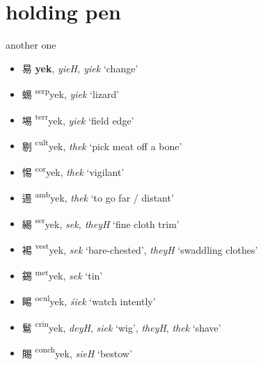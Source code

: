 \section{holding pen}

another one 

\begin{itemize}
    \item {\Large{易}} %
    {\large{\textbf{yek}}},
    \textit{yieH, yiek} `change' %

    \item {\Large{蜴}} %
    {\large{{\textsuperscript{serp}}yek}},
    \textit{yiek} `lizard' %

    \item {\Large{埸}} %
    {\large{{\textsuperscript{terr}}yek}},
    \textit{yiek} `field edge' %

    \item {\Large{剔}} %
    {\large{{\textsuperscript{cult}}yek}},
    \textit{thek} `pick meat off a bone' %

    \item {\Large{惕}} %
    {\large{{\textsuperscript{cor}}yek}},
    \textit{thek} `vigilant' %

    \item {\Large{逷}} %
    {\large{{\textsuperscript{amb}}yek}},
    \textit{thek} `to go far / distant' %

    \item {\Large{緆}} %
    {\large{{\textsuperscript{ser}}yek}},
    \textit{sek, theyH} `fine cloth trim' %

    \item {\Large{裼}} %
    {\large{{\textsuperscript{vest}}yek}},
    \textit{sek} `bare-chested', \textit{theyH} `swaddling clothes' %


    \item {\Large{錫}} %
    {\large{{\textsuperscript{met}}yek}},
    \textit{sek} `tin' %

    \item {\Large{睗}} %
    {\large{{\textsuperscript{ocul}}yek}},
    \textit{śiek} `watch intently' %
    

    \item {\Large{鬄}} %
    {\large{{\textsuperscript{crin}}yek}},
    \textit{deyH}, \textit{siek}  `wig', \textit{theyH}, \textit{thek} `shave' %

    \item {\Large{賜}} %
    {\large{{\textsuperscript{conch}}yek}},
    \textit{sieH} `bestow' %
\end{itemize}

